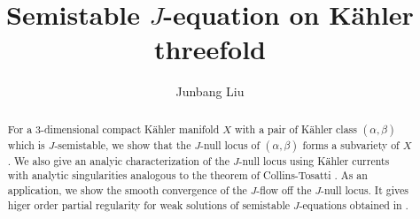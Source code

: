 \documentclass[reqno]{amsart}
\title{Semistable $J$-equation on K\"ahler threefold}
\author{Junbang Liu}
\theoremstyle{remark}
\theoremstyle{plain}
\begin{document}
\maketitle
\begin{abstract}
    For a $3$-dimensional compact K\"ahler manifold $X$ with a pair of K\"ahler class $(\alpha,\beta)$ which is $J$-semistable, we show that the $J$-null locus of $(\alpha,\beta)$ forms a subvariety of $X$. We also give an analyic characterization of the $J$-null locus using K\"ahler currents with analytic singularities analogous to the theorem of Collins-Tosatti \cite{CT15}. As an application, we show the smooth convergence of the $J$-flow off the $J$-null locus. It gives higer order partial regularity for weak solutions of semistable $J$-equations obtained in \cite{M26b}. 
\end{abstract}
\tableofcontents
\end{document}
